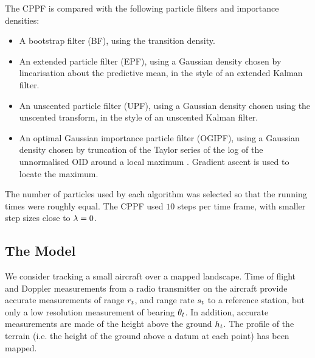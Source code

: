 \documentclass[conference]{IEEEtran}
\begin{document}
The CPPF is compared with the following particle filters and importance densities:
\begin{itemize}
	\item A bootstrap filter (BF), using the transition density.
	\item An extended particle filter (EPF), using a Gaussian density chosen by linearisation about the predictive mean, in the style of an extended Kalman filter.
	\item An unscented particle filter (UPF), using a Gaussian density chosen using the unscented transform, in the style of an unscented Kalman filter.
	\item An optimal Gaussian importance particle filter (OGIPF), using a Gaussian density chosen by truncation of the Taylor series of the log of the unnormalised OID around a local maximum \cite{Doucet2000a}. Gradient ascent is used to locate the maximum.
\end{itemize}

The number of particles used by each algorithm was selected so that the running times were roughly equal. The CPPF used $10$ steps per time frame, with smaller step sizes close to $\lambda=0$.

\subsection{The Model}

We consider tracking a small aircraft over a mapped landscape. Time of flight and Doppler measurements from a radio transmitter on the aircraft provide accurate measurements of range $r_{t}$, and range rate $s_{t}$ to a reference station, but only a low resolution measurement of bearing $\theta_{t}$. In addition, accurate measurements are made of the height above the ground $h_{t}$. The profile of the terrain (i.e. the height of the ground above a datum at each point) has been mapped.
\end{document}
